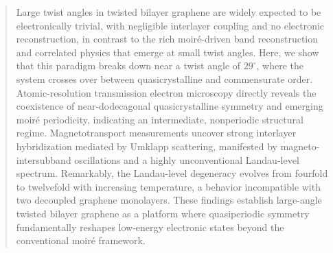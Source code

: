 \documentclass[reprint,
superscriptaddress,amsmath,amssymb,aps,prl]{revtex4-2}
\begin{document}
\begin{CJK*}{UTF8}{bsmi}
\author{Takashi Taniguchi}

\author{Ming-Wen Chu}



\author{Ming-Hao Liu (劉明豪)}


\author{Tse-Ming Chen}



\begin{abstract}

Large twist angles in twisted bilayer graphene are widely expected to be electronically trivial, with negligible interlayer coupling and no electronic reconstruction, in contrast to the rich moir\'{e}-driven band reconstruction and correlated physics that emerge at small twist angles. Here, we show that this paradigm breaks down near a twist angle of $29^\circ$, where the system crosses over between quasicrystalline and commensurate order. Atomic-resolution transmission electron microscopy directly reveals the coexistence of near-dodecagonal quasicrystalline symmetry and emerging moir\'{e} periodicity, indicating an intermediate, nonperiodic structural regime. Magnetotransport measurements uncover strong interlayer hybridization mediated by Umklapp scattering, manifested by magneto-intersubband oscillations and a highly unconventional Landau-level spectrum. Remarkably, the Landau-level degeneracy evolves from fourfold to twelvefold with increasing temperature, a behavior incompatible with two decoupled graphene monolayers. These findings establish large-angle twisted bilayer graphene as a platform where quasiperiodic symmetry fundamentally reshapes low-energy electronic states beyond the conventional moir\'{e} framework.
\end{abstract}


\maketitle
\end{CJK*}
\end{document}
